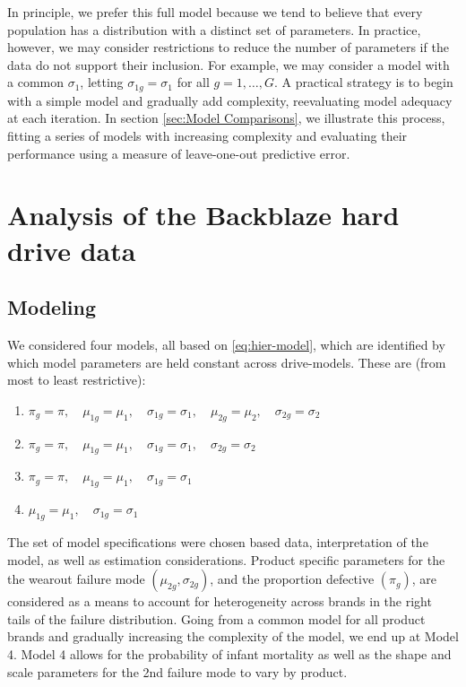 \documentclass[12pt]{article}
\begin{document}
In principle, we prefer this full model because we tend to believe that every population has a distribution with a distinct set of parameters. In practice, however, we may consider restrictions to reduce the number of parameters if the data do not support their inclusion. For example, we may consider a model with a common $\sigma_{1}$, letting $\sigma_{1g}=\sigma_1$ for all $g=1,\ldots,G$. A practical strategy is to begin with a simple model and gradually add complexity, reevaluating model adequacy at each iteration. In section \ref{sec:Model Comparisons}, we illustrate this process, fitting a series of models with increasing complexity and evaluating their performance using a measure of leave-one-out predictive error.


\section{Analysis of the Backblaze hard drive data}
\label{sec:Data analysis}
\subsection{Modeling}
We considered four models, all based on \ref{eq:hier-model}, which are identified by which model parameters are held constant across drive-models. These are (from most to least restrictive):

\begin{enumerate}
\item $\pi_{g} = \pi,\quad \mu_{1g} = \mu_1,\quad \sigma_{1g}=\sigma_1,\quad \mu_{2g} = \mu_2,\quad \sigma_{2g} = \sigma_2$
\item $\pi_{g} = \pi,\quad \mu_{1g} = \mu_1,\quad \sigma_{1g}=\sigma_1,\quad \sigma_{2g} = \sigma_2$
\item $\pi_{g} = \pi,\quad \mu_{1g} = \mu_1,\quad \sigma_{1g}=\sigma_1$
\item $\mu_{1g} = \mu_1,\quad \sigma_{1g}=\sigma_1$
\end{enumerate}

The set of model specifications were chosen based data, interpretation of the model, as well as estimation considerations.  Product specific parameters for the the wearout failure mode $(\mu_{2g},\sigma_{2g})$, and the proportion defective $(\pi_g)$, are considered as a means to account for heterogeneity across brands in the right tails of the failure distribution.  Going from a common model for all product brands and gradually increasing the complexity of the model, we end up at Model 4.  Model 4 allows for the probability of infant mortality as well as the shape and scale parameters for the 2nd failure mode to vary by product.
\end{document}
